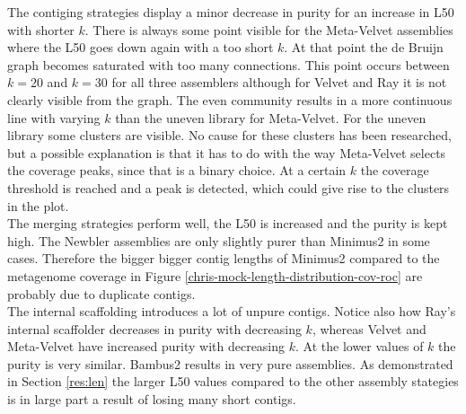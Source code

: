 \documentclass[a4paper,12pt]{report}
\begin{document}
The contiging strategies display a minor decrease in purity for an increase in
L50 with shorter $k$. There is always some point visible for the Meta-Velvet
assemblies where the L50 goes down again with a too short $k$. At that point
the de Bruijn graph becomes saturated with too many connections. This point
occurs between $k=20$ and $k=30$ for all three assemblers although for Velvet
and Ray it is not clearly visible from the graph. The even community results in
a more continuous line with varying $k$ than the uneven library for
Meta-Velvet. For the uneven library some clusters are visible. No cause for
these clusters has been researched, but a possible explanation is that it has
to do with the way Meta-Velvet selects the coverage peaks, since that is a
binary choice. At a certain $k$ the coverage threshold is reached and a peak is
detected, which could give rise to the clusters in the plot.\\


The merging strategies perform well, the L50 is increased and the purity is
kept high. The Newbler assemblies are only slightly purer than Minimus2 in some
cases. Therefore the bigger bigger contig lengths of Minimus2 compared to the
metagenome coverage in Figure \ref{chris-mock-length-distribution-cov-roc} are
probably due to duplicate contigs.\\


The internal scaffolding introduces a lot of unpure contigs. Notice also how
Ray's internal scaffolder decreases in purity with decreasing $k$, whereas
Velvet and Meta-Velvet have increased purity with decreasing $k$. At the lower
values of $k$ the purity is very similar. Bambus2 results in very pure
assemblies. As demonstrated in Section \ref{res:len} the larger L50 values
compared to the other assembly stategies is in large part a result of losing
many short contigs.\\
\end{document}
